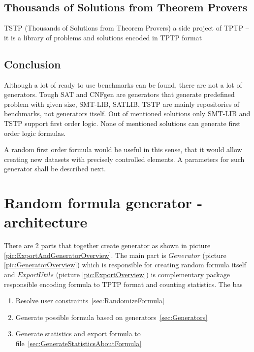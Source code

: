 \section{Thousands of Solutions from Theorem Provers}

\gls{TSTP} (Thousands of Solutions from Theorem Provers) a side project of \gls{TPTP} \cite{Sut17} -- it is a library of problems and solutions encoded in TPTP format

\section{Conclusion}

Although a lot of ready to use benchmarks can be found, there are not a lot of generators. Tough SAT and CNFgen are generators that generate predefined problem with given size, SMT-LIB, SATLIB, TSTP are mainly repositories of benchmarks, not generators itself. Out of mentioned solutions only SMT-LIB and TSTP support first order logic. None of mentioned solutions can generate first order logic formulas. 

A random first order formula would be useful in this sense, that it would allow creating new datasets with precisely controlled elements. A parameters for such generator shall be described next.

\chapter{Random formula generator - architecture}
\label{chap:Generator}

There are 2 parts that together create generator as shown in picture \ref{pic:ExportAndGeneratorOverview}. The main part is $Generator$ (picture \ref{pic:GeneratorOverview}) which is responsible for creating random formula itself and $ExportUtils$ (picture \ref{pic:ExportOverview}) is complementary package responsible encoding formula to \gls{TPTP} format and counting statistics. The bas

\begin{enumerate}
  \item Resolve user constraints~\ref{sec:RandomizeFormula}
  \item Generate possible formula based on generators~\ref{sec:Generators}
  \item Generate statistics and export formula to file~\ref{sec:GenerateStatisticsAboutFormula}
\end{enumerate}

